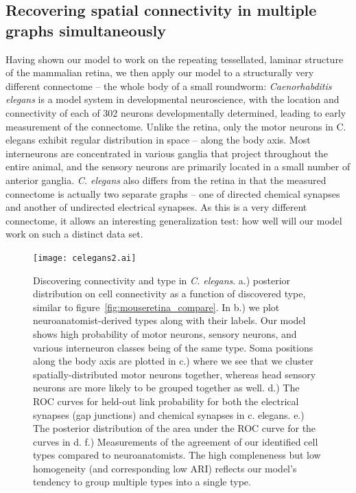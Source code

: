 \documentclass{article}
\begin{document}
{\subsection*{Recovering spatial connectivity in multiple graphs simultaneously}

Having shown our model to work on the repeating tessellated, laminar
structure of the mammalian retina, we then apply our model to a
structurally very different connectome -- the whole body of a small
roundworm: \textit{Caenorhabditis elegans} is a model system in
developmental neuroscience\autocite{White1986}, with the location and
connectivity of each of 302 neurons developmentally determined,
leading to early measurement of the connectome. Unlike the retina,
only the motor neurons in C. elegans exhibit regular distribution in
space -- along the body axis. Most interneurons are concentrated in
various ganglia that project throughout the entire animal, and the
sensory neurons are primarily located in a small number of anterior
ganglia. \textit{C. elegans} also differs from the retina in that the
measured connectome is actually two separate graphs -- one of directed
chemical synapses and another of undirected electrical synapses. As
this is a very different connectome, it allows an interesting
generalization test: how well will our model work on such a distinct
data set.

\begin{figure}
  \centering 
  \centerline{\texttt{[image: celegans2.ai]}}
  \caption{Discovering connectivity and type in
    \textit{C. elegans}. a.) posterior distribution on cell
    connectivity as a function of discovered type, similar to
    figure~\ref{fig:mouseretina_compare}. In b.) we plot
    neuroanatomist-derived types along with their labels. Our model
    shows high probability of motor neurons, sensory neurons, and
    various interneuron classes being of the same type. Soma positions
    along the body axis are plotted in c.) where we see that we
    cluster spatially-distributed motor neurons together, whereas head
    sensory neurons are more likely to be grouped together as well.
    d.) The ROC curves for held-out link probability for both the
    electrical synapses (gap junctions) and chemical synapses in
    c. elegans. e.) The posterior distribution of the area under the
    ROC curve for the curves in d. f.) Measurements of the agreement
    of our identified cell types compared to neuroanatomists. The high
    compleneness but low homogeneity (and corresponding low ARI)
    reflects our model's tendency to group multiple types into a
    single type.}
  \label{fig:celegans}
\end{figure}



}
\end{document}
